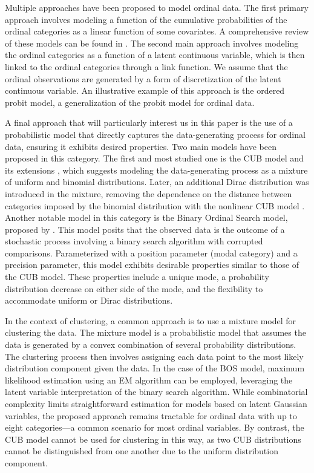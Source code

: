 Multiple approaches have been proposed to model ordinal data. The first primary approach involves modeling a function of the cumulative probabilities of the ordinal categories as a linear function of some covariates. A comprehensive review of these models can be found in \cite{agresti2010analysis}. The second main approach involves modeling the ordinal categories as a function of a latent continuous variable, which is then linked to the ordinal categories through a link function. We assume that the ordinal observations are generated by a form of discretization of the latent continuous variable. An illustrative example of this approach is the ordered probit model, a generalization of the probit model for ordinal data.

A final approach that will particularly interest us in this paper is the use of a probabilistic model that directly captures the data-generating process for ordinal data, ensuring it exhibits desired properties. Two main models have been proposed in this category. The first and most studied one is the CUB model and its extensions \citep{d2005mixture}, which suggests modeling the data-generating process as a mixture of uniform and binomial distributions. Later, an additional Dirac distribution was introduced in the mixture, removing the dependence on the distance between categories imposed by the binomial distribution with the nonlinear CUB model \citep{manisera2014modeling}.
Another notable model in this category is the Binary Ordinal Search model, proposed by \cite{biernacki2016model}. This model posits that the observed data is the outcome of a stochastic process involving a binary search algorithm with corrupted comparisons. Parameterized with a position parameter (modal category) and a precision parameter, this model exhibits desirable properties similar to those of the CUB model. These properties include a unique mode, a probability distribution decrease on either side of the mode, and the flexibility to accommodate uniform or Dirac distributions.

In the context of clustering, a common approach is to use a mixture model for clustering the data. The mixture model is a probabilistic model that assumes the data is generated by a convex combination of several probability distributions. The clustering process then involves assigning each data point to the most likely distribution component given the data. In the case of the BOS model, maximum likelihood estimation using an EM algorithm can be employed, leveraging the latent variable interpretation of the binary search algorithm. While combinatorial complexity limits straightforward estimation for models based on latent Gaussian variables, the proposed approach remains tractable for ordinal data with up to eight categories—a common scenario for most ordinal variables. By contrast, the CUB model cannot be used for clustering in this way, as two CUB distributions cannot be distinguished from one another due to the uniform distribution component.


